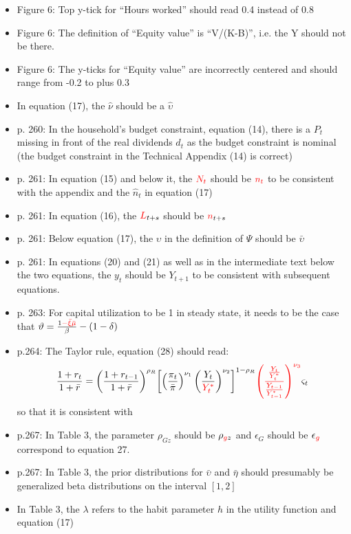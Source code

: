 \documentclass[11pt,a4paper]{article}
\begin{document}
\begin{itemize}
  \item Figure 6: Top y-tick for ``Hours worked'' should read 0.4 instead of 0.8
  \item Figure 6: The definition of ``Equity value'' is ``V/(K-B)'', i.e. the Y should not be there.
  \item Figure 6: The y-ticks for ``Equity value'' are incorrectly centered and should range from -0.2 to plus 0.3
  \item In equation (17), the $\hat \nu$ should be a $\hat \upsilon$
  \item p. 260: In the household's budget constraint, equation (14), there is a $P_t$ missing in front of the real dividends $d_t$ as the budget constraint is nominal (the budget constraint in the Technical Appendix (14) is correct)
  \item p. 261: In equation (15) and below it, the $\textcolor{red}{N_t}$ should be $\textcolor{red}{n_t}$ to be consistent with the appendix and the $\hat n_t$ in equation (17)
  \item p. 261: In equation (16), the $\textcolor{red}{L}_{t+s}$ should be $\textcolor{red}{n}_{t+s}$ 
  \item p. 261: Below equation (17), the $\upsilon$ in the definition of $\Psi$ should be $\bar \upsilon$
  \item p. 261: In equations (20) and (21) as well as in the intermediate text below the two equations, the $y_t$ should be $Y_{t+1}$ to be consistent with subsequent equations.
  \item p. 263: For capital utilization to be 1 in steady state, it needs to be the case that $\vartheta={\frac{{1 \textcolor{red}{- \bar \xi \bar \mu} }}{\beta} - \left( {1 - \delta } \right)}$
  \item p.264: The Taylor rule, equation (28) should read:
  \[
  \frac{{1 + {r_t}}}{{1 + \bar r}} = {\left( {\frac{{1 + {r_{t - 1}}}}{{1 + \bar r}}} \right)^{{\rho _R}}}{\left[ {\left( {\frac{{{\pi _t}}}{{\bar \pi }}}\right)^{\nu_1}{{\left( {\frac{{{Y_t}}}{\textcolor{red}{Y_t^*}}} \right)}^{{\nu _2}}}} \right]^{1 - {\rho _R}}}\textcolor{red}{\left( \frac{\frac{Y_t}{Y_{t}^*}}{\frac{Y_{t-1}}{Y_{t - 1}^*}} \right)^{{\nu _3}}}\varsigma_t
  \]
  so that it is consistent with \citet{SmetsWouters2007}
  \item p.267: In Table 3, the parameter $\rho_{Gz}$ should be $\rho_{\textcolor{red}{g}z}$ and $\epsilon_G$ should be $\epsilon_{\textcolor{red}{g}}$  correspond to equation 27.
  \item p.267: In Table 3, the prior distributions for $\bar \upsilon$ and $\bar \eta$ should presumably be generalized beta distributions on the interval $[1,2]$
  \item In Table 3, the $\lambda$ refers to the habit parameter $h$ in the utility function and equation (17)
\end{itemize}
\end{document}
